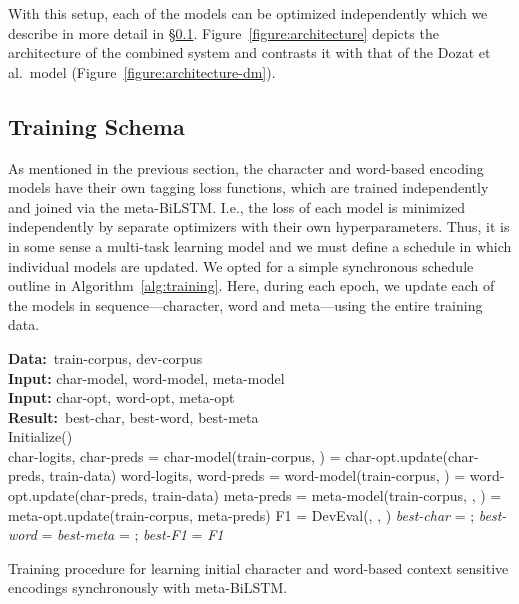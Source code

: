 \documentclass[11pt,a4paper]{article}
\begin{document}
With this setup, each of the models can be optimized independently which we describe in more detail in \S\ref{sec:schema}. Figure~\ref{figure:architecture} depicts the architecture of the combined system and contrasts it with that of the Dozat et al.\ model (Figure~\ref{figure:architecture-dm}).




\subsection{Training Schema}
\label{sec:schema}

As mentioned in the previous section, the character and word-based encoding models have their own tagging loss functions, which are trained independently and joined via the meta-BiLSTM. I.e., the loss of each model is minimized independently by separate optimizers with their own hyperparameters. 
Thus, it is in some sense a multi-task learning model and we must define a schedule in which individual models are updated. We opted for a simple synchronous schedule outline in Algorithm~\ref{alg:training}. Here, during each epoch, we update each of the models in sequence---character, word and meta---using the entire training data.


\begin{algorithm}[ht!]
\small
\SetNoFillComment
\newcommand{\var}[1]{\textit{#1}}
\newcommand{\kw}[1]{\textbf{#1}}
\newcommand\mycommfont[1]{\footnotesize\ttfamily{#1}}
 \kw{Data:}~{train-corpus, dev-corpus}\\
 \textbf{Input:} char-model, word-model, meta-model\\
 \textbf{Input:} char-opt, word-opt, meta-opt \\
 \kw{Result:}~{best-char, best-word, best-meta}\\
 Initialize()\\
 \For{epoch = 1 \kw{to} MAX}  { 
   char-logits, char-preds =  char-model(train-corpus, )
    = char-opt.update(char-preds, train-data)
   word-logits, word-preds =  word-model(train-corpus, )
    = word-opt.update(char-preds, train-data)
   meta-preds = meta-model(train-corpus, , )
    = meta-opt.update(train-corpus, meta-preds)
  F1 = DevEval(, , )
   {
    \var{best-char} = ; \var{best-word} =  
    \var{best-meta} = ; \var{best-F1} = \var{F1}
  }
}
 
 \caption{Training procedure for learning initial character and word-based context sensitive encodings synchronously with meta-BiLSTM.}
 \label{alg:training}
\end{algorithm}
\end{document}
